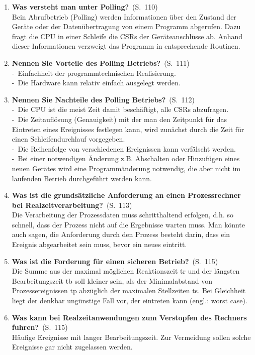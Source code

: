\documentclass[a4paper,12pt]{article}
\newcommand{\question}[3]{\pagebreak[3]\item {\textbf{#1?}}\ (S.\ #2)#3}
\newcommand{\catchword}[1]{\\-\ #1}
\newcommand{\normaltext}[1]{\\#1}
\newcommand{\page}[1]{#1}
\begin{document}
\begin{enumerate}
  \question{Was versteht man unter Polling}{\page{110}}
  {
    \normaltext{Bein Abrufbetrieb (Polling) werden Informationen über den Zustand der Geräte
                oder der Datenübertragung von einem Programm abgerufen. Dazu fragt die CPU in einer Schleife
                die CSRs der Geräteanschlüsse ab. Anhand dieser Informationen verzweigt das Programm in 
                entsprechende Routinen.}
  }

  \question{Nennen Sie Vorteile des Polling Betriebs}{\page{111}}
  {
    \catchword{Einfachheit der programmtechnischen Realisierung.}
    \catchword{Die Hardware kann relativ einfach ausgelegt werden.}
  }

  \question{Nennen Sie Nachteile des Polling Betriebs}{\page{112}}
  {
    \catchword{Die CPU ist die meist Zeit damit beschäftigt, alle CSRs abzufragen.}
    \catchword{Die Zeitauflösung (Genauigkeit) mit der man den Zeitpunkt für das Eintreten
               eines Ereignisses festlegen kann, wird zunächst durch die Zeit für einen Schleifendurchlauf
               vorgegeben.}
    \catchword{Die Reihenfolge von verschiedenen Ereignissen kann verfälscht werden.}
    \catchword{Bei einer notwendigen Änderung z.B. Abschalten oder Hinzufügen eines neuen
               Gerätes wird eine Programmänderung notwendig, die aber nicht im laufenden Betrieb 
               durchgeführt werden kann.}
  }

  \question{Was ist die grundsätzliche Anforderung an einen Prozessrechner bei
            Realzeitverarbeitung}{\page{113}}
  {
    \normaltext{Die Verarbeitung der Prozessdaten muss schritthaltend erfolgen, d.h. so schnell,
                dass der Prozess nicht auf  die Ergebnisse warten muss. Man könnte auch sagen,
                die Anforderung durch den Prozess besteht darin, dass ein Ereignis abgearbeitet sein muss,
                bevor ein neues eintritt.}
  }

  \question{Was ist die Forderung für einen sicheren Betrieb}{\page{115}}
  {
    \normaltext{Die Summe aus der maximal möglichen Reaktionszeit tr und der längsten Bearbeitungszeit tb
                soll kleiner sein, als der Minimalabstand von Prozessereignissen tp abzüglich der maximalen 
                Stellzeiten ts. Bei Gleichheit liegt der denkbar ungünstige Fall vor, der eintreten kann
                (engl.: worst case).}
  }

  \question{Was kann bei Realzeitanwendungen zum Verstopfen des Rechners fuhren}{\page{115}}
  {
    \normaltext{Häufige Ereignisse mit langer Bearbeitungszeit. Zur Vermeidung sollen solche Ereignisse gar 
                nicht zugelassen werden.}
  }



\end{enumerate}
\end{document}
